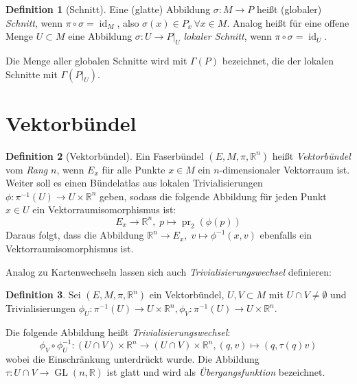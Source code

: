 \documentclass[a4paper]{scrbook}
\numberwithin{equation}{chapter}
\DeclareMathOperator{\id}{id}
\DeclareMathOperator{\GL}{GL}
\DeclareMathOperator{\pr}{pr}
\newcommand{\R}{\mathbb{R}}
\theoremstyle{definition}
\newtheorem{defn}{Definition}[section]
\begin{document}
		\begin{defn}[Schnitt]
			Eine (glatte) Abbildung $\sigma\colon M\rightarrow P$ heißt (globaler) \emph{Schnitt}, wenn $\pi\circ\sigma=\id_M$, also $\sigma(x)\in P_x\, \forall x\in M$. Analog heißt für eine offene Menge $U\subset M$ eine Abbildung $\sigma\colon U\rightarrow P\vert_U$ \emph{lokaler Schnitt}, wenn $\pi\circ\sigma=\id_U$.

			Die Menge aller globalen Schnitte wird mit $\Gamma(P)$ bezeichnet, die der lokalen Schnitte mit $\Gamma(P\vert_U)$.
		\end{defn}
	\section{Vektorbündel}
		\begin{defn}[Vektorbündel]
				Ein Faserbündel $(E,M,\pi,\R^n)$ heißt \emph{Vektorbündel} vom \emph{Rang} $n$, wenn $E_x$ für alle Punkte $x\in M$ ein $n$-dimensionaler Vektorraum ist. Weiter soll es einen Bündelatlas aus lokalen Trivialisierungen ${\phi\colon \pi^{-1}(U)\rightarrow U\times \R^n}$ geben, sodass die folgende Abbildung für jeden Punkt $x\in U$ ein Vektorraumisomorphismus ist:
				\begin{equation*}
					E_x\rightarrow \R^n,\; p\mapsto \pr_2(\phi(p))
				\end{equation*}
			Daraus folgt, dass die Abbildung ${\R^n\rightarrow E_x,\; v\mapsto \phi^{-1}(x,v)}$ ebenfalls ein Vektorraumisomorphismus ist.
		\end{defn}
		Analog zu Kartenwechseln lassen sich auch \emph{Trivialisierungswechsel} definieren:
		\begin{defn}
			Sei $(E,M,\pi,\R^n)$ ein Vektorbündel, $U,V\subset M$ mit $U\cap V\neq\emptyset$ und Trivialisierungen ${\phi_U\colon \pi^{-1}(U)\rightarrow U\times \R^n}, {\phi_V\colon \pi^{-1}(U)\rightarrow U\times \R^n}$.

			Die folgende Abbildung heißt \emph{Trivialisierungswechsel}:
			\begin{equation*}
				\phi_V\circ\phi_U^{-1}\colon (U\cap V)\times \R^n\rightarrow (U\cap V)\times \R^n, (q,v)\mapsto (q,\tau(q)v)
			\end{equation*}
			wobei die Einschränkung unterdrückt wurde. Die Abbildung $\tau\colon U\cap V\rightarrow \GL(n,\R)$ ist glatt und wird als \emph{Übergangsfunktion} bezeichnet.
		\end{defn}
\end{document}
